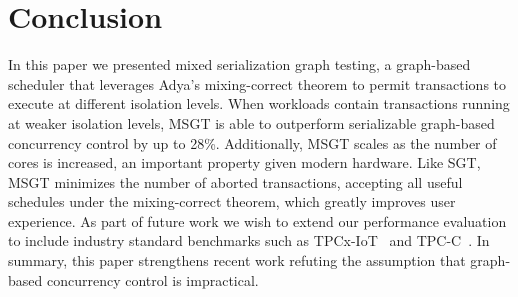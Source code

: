 \section{Conclusion}
\label{sec:msgt-conclusion}

In this paper we presented mixed serialization graph testing, a graph-based scheduler that 
leverages Adya's mixing-correct theorem to permit transactions to execute at different isolation levels.
When workloads contain transactions running at weaker isolation levels, MSGT is able to outperform 
serializable graph-based concurrency control by up to 28\%. Additionally, MSGT scales as the number of 
cores is increased, an important property  given modern hardware. Like SGT, MSGT minimizes the number 
of aborted transactions, accepting all useful schedules under the mixing-correct theorem, which greatly 
improves user experience. 
As part of future work we wish to extend our performance 
evaluation to include industry standard benchmarks such as TPCx-IoT~\cite{tpcx-iot} and TPC-C~\cite{tpcc}.
In summary, this paper 
strengthens recent work refuting the assumption that graph-based concurrency control is impractical.



